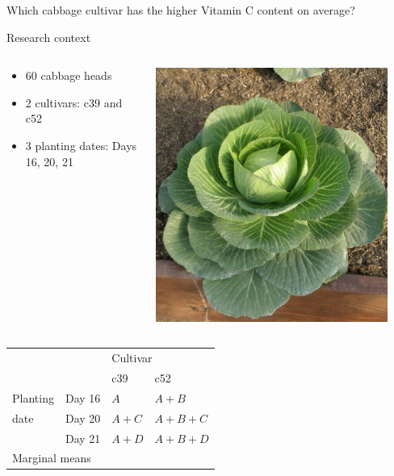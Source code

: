\documentclass{beamer}
\begin{document}
\begin{frame}{Which cabbage cultivar has the higher Vitamin C content on average?}
 \begin{block}{Research context}
 \begin{columns}
  \begin{column}{0.8\textwidth}
   \begin{itemize}
    \item 60 cabbage heads
    \item 2 cultivars: c39 and c52
    \item 3 planting dates: Days 16, 20, 21
   \end{itemize}
  \end{column}
  \begin{column}{0.2\textwidth}
    \includegraphics[width=0.9\textwidth]{Figures/cabbage}
  \end{column}

 \end{columns}
 \end{block}

 
 \pause
 
 \begin{center}
\begin{tabular}{|l | l | l | l | }
\toprule
  \multicolumn{2}{|l|}{} & \multicolumn{2}{l|}{Cultivar}\\
  \cmidrule(lr){3-4}
  \multicolumn{2}{|l|}{}  & c39 & c52\\
 	    \midrule
      Planting& Day 16 & $A$ & $A+B$\\
 	 date   & Day 20 & $A+C$ & $A+B+C$\\
		& Day 21 & $A+D$ & $A+B+D$\\
		\midrule
\multicolumn{2}{|l|}{Marginal means} &  & \\	
	    \bottomrule
  \end{tabular}
\end{center}
 
\end{frame}
\end{document}
